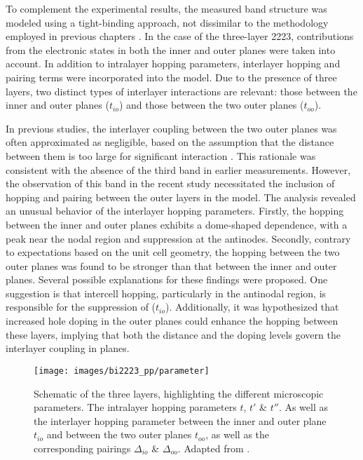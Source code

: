 To complement the experimental results, the measured band structure was modeled using a tight-binding approach, not dissimilar to the methodology employed in previous chapters \cite{luo_subtle_2021}.
In the case of the three-layer 2223, contributions from the electronic states in both the inner and outer  planes were taken into account.
In addition to intralayer hopping parameters, interlayer hopping and pairing terms were incorporated into the model.
Due to the presence of three layers, two distinct types of interlayer interactions are relevant: those between the inner and outer planes ($t_{io}$) and those between the two outer planes ($t_{oo}$).

In previous studies, the interlayer coupling between the two outer planes was often approximated as negligible, based on the assumption that the distance between them is too large for significant interaction \cite{kunisada_observation_2017,ideta_hybridization_2021}.
This rationale was consistent with the absence of the third band in earlier measurements.
However, the observation of this band in the recent study \cite{luo_electronic_2023} necessitated the inclusion of hopping and pairing between the outer layers in the model.
The analysis revealed an unusual behavior of the interlayer hopping parameters.
Firstly, the hopping between the inner and outer planes exhibits a dome-shaped dependence, with a peak near the nodal region and suppression at the antinodes.
Secondly, contrary to expectations based on the unit cell geometry, the hopping between the two outer planes was found to be stronger than that between the inner and outer planes.
Several possible explanations for these findings were proposed.
One suggestion is that intercell hopping, particularly in the antinodal region, is responsible for the suppression of ($t_{io}$).
Additionally, it was hypothesized that increased hole doping in the outer planes could enhance the hopping between these layers, implying that both the distance and the doping levels govern the interlayer coupling in  planes.

\begin{figure}
	\centering
	\texttt{[image: images/bi2223\_pp/parameter]}
	\caption{Schematic of the three  layers, highlighting the different microscopic parameters. The intralayer hopping parameters $t$, $t'$ \& $t''$. As well as the interlayer hopping parameter between the inner and outer plane $t_{io}$ and between the two outer planes $t_{oo}$, as well as the corresponding pairings $\Delta_{io}$ \& $\Delta_{oo}$. Adapted from \cite{luo_electronic_2023}.}
	\label{fig:parameter}
\end{figure}



